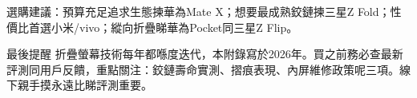 選購建議：預算充足追求生態揀華為Mate X；想要最成熟鉸鏈揀三星Z Fold；性價比首選小米/vivo；縱向折疊睇華為Pocket同三星Z Flip。

\begin{tcbinfo}{最後提醒}
折疊螢幕技術每年都喺度迭代，本附錄寫於2026年。買之前務必查最新評測同用戶反饋，重點關注：鉸鏈壽命實測、摺痕表現、內屏維修政策呢三項。線下親手摸永遠比睇評測重要。

\end{tcbinfo}
